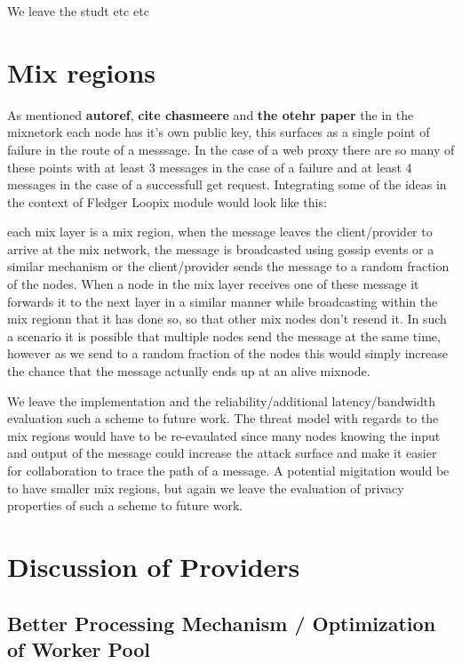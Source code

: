 \documentclass[a4paper,11pt,oneside]{report}
\begin{document}
We leave the studt etc etc

\section{Mix regions}
As mentioned \textbf{autoref}, \textbf{cite chasmeere} and \textbf{the otehr paper} the in the mixnetork each node has it's own public key, this surfaces as a single point of failure in the route of a messsage. In the case of a web proxy there are so many of these points with at least 3 messages in the case of a failure and at least 4 messages in the case of a successfull get request. Integrating some of the ideas in the context of Fledger Loopix module would look like this:

each mix layer is a mix region, when the message leaves the client/provider to arrive at the mix network, the message is broadcasted using gossip events or a similar mechanism or the client/provider sends the message to a random fraction of the nodes. When a node in the mix layer receives one of these message it forwards it to the next layer in a similar manner while broadcasting within the mix regionn that it has done so, so that other mix nodes don't resend it. In such a scenario it is possible that multiple nodes send the message at the same time, however as we send to a random fraction of the nodes this would simply increase the chance that the message actually ends up at an alive mixnode.

We leave the implementation and the reliability/additional latency/bandwidth evaluation such a scheme to future work. The threat model with regards to the mix regions would have to be re-evaulated since many nodes knowing the input and output of the message could increase the attack surface and make it easier for collaboration to trace the path of a message. A potential migitation would be to have smaller mix regions, but again we leave the evaluation of privacy properties of such a scheme to future work.


\section{Discussion of Providers}



\subsection{Better Processing Mechanism / Optimization of Worker Pool}
\end{document}

